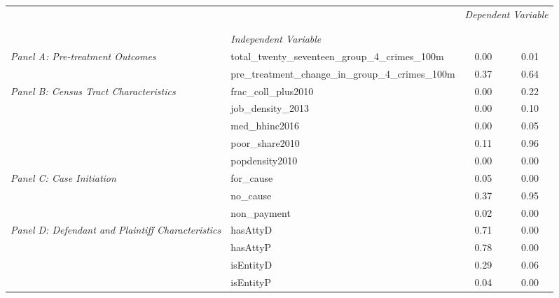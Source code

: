 \begin{tabular}{llcc}
\toprule
 &  & \multicolumn{2}{c}{\textit{Dependent Variable}} \\
\cline{3-4}
\\
 &  &  &  \\
 & \emph{Independent Variable} &  &  \\
\midrule
\multirow[c]{2}{3cm}{\textit{Panel A: Pre-treatment Outcomes}} & total_twenty_seventeen_group_4_crimes_100m & 0.00 & 0.01 \\
 & pre_treatment_change_in_group_4_crimes_100m & 0.37 & 0.64 \\
\cline{1-4}
\multirow[c]{5}{3cm}{\textit{Panel B: Census Tract Characteristics}} & frac_coll_plus2010 & 0.00 & 0.22 \\
 & job_density_2013 & 0.00 & 0.10 \\
 & med_hhinc2016 & 0.00 & 0.05 \\
 & poor_share2010 & 0.11 & 0.96 \\
 & popdensity2010 & 0.00 & 0.00 \\
\cline{1-4}
\multirow[c]{3}{3cm}{\textit{Panel C: Case Initiation}} & for_cause & 0.05 & 0.00 \\
 & no_cause & 0.37 & 0.95 \\
 & non_payment & 0.02 & 0.00 \\
\cline{1-4}
\multirow[c]{4}{3cm}{\textit{Panel D: Defendant and Plaintiff Characteristics}} & hasAttyD & 0.71 & 0.00 \\
 & hasAttyP & 0.78 & 0.00 \\
 & isEntityD & 0.29 & 0.06 \\
 & isEntityP & 0.04 & 0.00 \\
\cline{1-4}
\bottomrule
\end{tabular}
